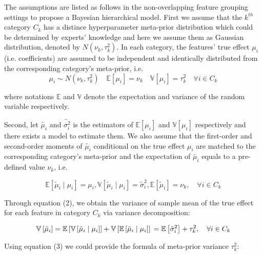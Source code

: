 \documentclass{article}
\begin{document}
The assumptions are listed as follows in the non-overlapping feature grouping settings to propose a Bayesian hierarchical model. First we assume that the $k^{th}$ category $C_k$ has a distince hyperparameter meta-prior distribution which could be determined by experts' knowledge and here we assume them as Gaussian distribution, denoted by $N(\nu_k,\tau_k^2)$. In each category, the features' true effect $\mu_i$ (i.e. coefficients) are assumed to be independent and identically distributed from the corresponding category's meta-prior, i.e. 
\begin{equation}
  \mu_i \sim N(\nu_k,\tau_k^2) \quad \mathbb{E}[\mu_i] = \nu_k \quad \mathbb{V}[\mu_i] = \tau_k^2 \quad \forall i \in C_k
\end{equation}


where notations $\mathbb{E}$ and $\mathbb{V}$ denote the expectation and variance of the random variable respectively.

Second, let $\tilde{\mu_i}$ and $\tilde{\sigma_i^2}$ is the estimators of  $\mathbb{E}[\mu_i]$ and $\mathbb{V}[\mu_i]$ respectively and there exists a model to estimate them. We also assume that the first-order and second-order moments of $\tilde{\mu_i}$ conditional on the true effect $\mu_i$ are matched to the corresponding category's meta-prior and the expectation of $\tilde{\mu_i}$ equals to a pre-defined value $\nu_k$, i.e.

\begin{equation}
  \mathbb{E}\left[\tilde{\mu}_{i} \mid \mu_{i}\right]=\mu_{i}, \mathbb{V}\left[\tilde{\mu}_{i} \mid \mu_{i}\right]=\tilde{\sigma}_{i}^{2}, \mathbb{E}\left[\tilde{\mu}_{i}\right]=\nu_{k}, \quad \forall i \in C_{k}
\end{equation}

Through equation (2), we obtain the variance of sample mean of the true effect for each feature in category $C_k$ via variance decomposition:

\begin{equation}
  \mathbb{V}\left[\tilde{\mu}_{i}\right] =\mathbb{E}\left[\mathbb{V}\left[\tilde{\mu}_{i} \mid \mu_{i}\right]\right]+\mathbb{V}\left[\mathbb{E}\left[\tilde{\mu}_{i} \mid \mu_{i}\right]\right] \\ =\mathbb{E}\left[\tilde{\sigma}_{i}^{2}\right]+\tau_{k}^{2}, \quad \forall i \in C_{k}
\end{equation}

Using equation (3) we could provide the formula of meta-prior variance $\tau_{k}^{2}$: 
\end{document}
